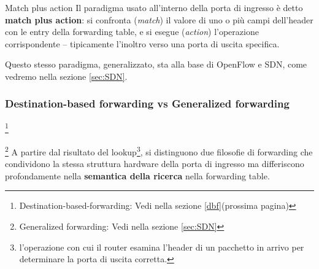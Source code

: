 \documentclass[a4paper,12pt]{report}
\begin{document}
\begin{notebox}{Match plus action}
Il paradigma usato all'interno della porta di ingresso è detto
\textbf{match plus action}: si confronta (\textit{match}) il valore di uno
o più campi dell'header con le entry della forwarding table, e si esegue
(\textit{action}) l'operazione corrispondente -- tipicamente l'inoltro verso
una porta di uscita specifica. 

Questo stesso paradigma, generalizzato,
sta alla base di OpenFlow e SDN, come vedremo nella sezione \ref{sec:SDN}.
\end{notebox}

\newpage
\subsubsection{Destination-based forwarding vs Generalized forwarding}\footnote{Destination-based-forwarding: Vedi nella sezione \ref{dbf}(prossima pagina)}

\footnote{Generalized forwarding: Vedi nella sezione \ref{sec:SDN}}
A partire dal risultato del lookup\footnote{l'operazione con cui il router esamina l'header di un pacchetto in arrivo per determinare la porta di uscita corretta.}, si distinguono due filosofie di
forwarding che condividono la stessa struttura hardware della porta di
ingresso ma differiscono profondamente nella \textbf{semantica della
ricerca} nella forwarding table.
\end{document}
